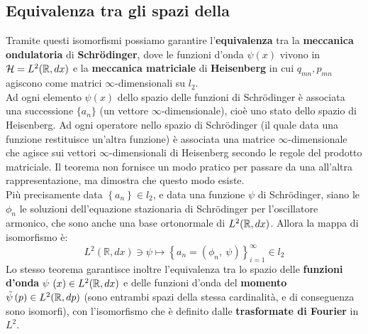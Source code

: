 \documentclass[FisicaTeorica.tex]{subfiles}
\begin{document}
\subsection{Equivalenza tra gli spazi della \MQ}
Tramite questi isomorfismi  possiamo garantire l'\textbf{equivalenza} tra la \textbf{meccanica ondulatoria} di \textbf{Schrödinger}, dove le funzioni d'onda $\psi(x)$ vivono in $\mathcal{H}=L^2(\mathbb{R}, dx)$ e la \textbf{meccanica matriciale} di \textbf{Heisenberg} in cui $q_{mn}, p_{mn}$ agiscono come matrici $\infty$-dimensionali su $l_2$.\\
Ad ogni elemento $\psi(x)$ dello spazio delle funzioni di Schrödinger è associata una successione $\{a_n\}$ (un vettore $\infty$-dimensionale), cioè uno stato dello spazio di Heisenberg. Ad ogni operatore nello spazio di Schrödinger (il quale data una funzione restituisce un'altra funzione) è associata una matrice $\infty$-dimensionale che agisce sui vettori $\infty$-dimensionali di Heisenberg secondo le regole del prodotto matriciale. Il teorema non fornisce un modo pratico per passare da una all'altra rappresentazione, ma dimostra che questo modo esiste. \\
Più precisamente data $\left\{a_n\right\}\in l_2$, e data una funzione $\psi$ di Schrödinger, siano le  $\phi_n$ le soluzioni dell'equazione stazionaria di Schrödinger per l'oscillatore armonico, che sono anche una base ortonormale di $L^2(\mathbb{R}, dx)$. Allora la mappa di isomorfismo è:
\[
L^2\left(\mathbb R,dx\right)\ni\psi \mapsto \left\{a_n=\left(\phi_n,\ \psi\right)\right\}_{i=1}^\infty\in l_2
\]
Lo stesso teorema garantisce inoltre l'equivalenza tra lo spazio delle \textbf{funzioni d'onda} $\psi$ $\left(x\right)\in L^2(\mathbb{R}, dx)$ e delle funzioni d'onda del \textbf{momento} $\tilde{\psi}\left(p\right)\in L^2(\mathbb{R},dp)$ (sono entrambi spazi della stessa cardinalità, e di conseguenza sono isomorfi), con l'isomorfismo che è definito dalle \textbf{trasformate di Fourier} in $L^2$.\\
\end{document}
